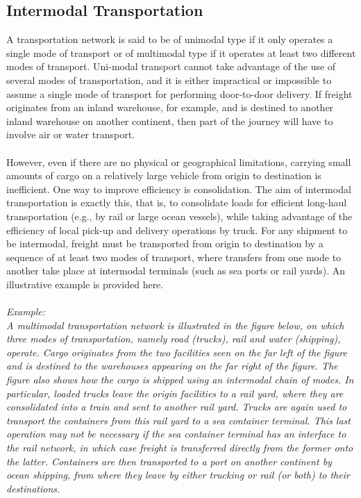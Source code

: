 \subsection{Intermodal Transportation}
A transportation network is said to be of unimodal type if it only operates a single mode of transport or of multimodal type if it operates at least two different modes of transport. Uni-modal transport cannot take advantage of the use of several modes of transportation, and it is either impractical or impossible to assume a single mode of transport for performing door-to-door delivery. If freight originates from an inland warehouse, for example, and is destined to another inland warehouse on another continent, then part of the journey will have to involve air or water transport.
\paragraph{}
However, even if there are no physical or geographical limitations, carrying small amounts of cargo on a relatively large vehicle from origin to destination is inefficient. One way to improve efficiency is consolidation. The aim of intermodal transportation is exactly this, that is, to consolidate loads for efficient long-haul transportation (e.g., by rail or large ocean vessels), while taking advantage of the efficiency of local pick-up and delivery operations by truck. For any shipment to be intermodal, freight must be transported from origin to destination by a sequence of at least two modes of transport, where transfers from one mode to another take place at intermodal terminals (such as sea ports or rail yards). An illustrative example is provided here.
\\\\
\textit{Example:}\\
\textit{A multimodal transportation network is illustrated in the figure below, on which three modes of transportation, namely road (trucks), rail and water (shipping), operate. Cargo originates from the two facilities seen on the far left of the figure and is destined to the warehouses appearing on the far right of the figure. The figure also shows how the cargo is shipped using an intermodal chain of modes. In particular, loaded trucks leave the origin facilities to a rail yard, where they are consolidated into a train and sent to another rail yard. Trucks are again used to transport the containers from this rail yard to a sea container terminal. This last operation may not be necessary if the sea container terminal has an interface to the rail network, in which case freight is transferred directly from the former onto the latter. Containers are then transported to a port on another continent by ocean shipping, from where they leave by either trucking or rail (or both) to their destinations.}
